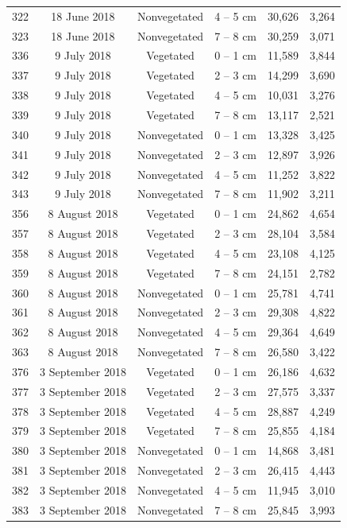 \documentclass[12pt,]{article}
\begin{document}
\begin{longtable}[t]{cccccc}
322 & 18 June 2018 & Nonvegetated & 4 – 5 cm & 30,626 & 3,264\\
323 & 18 June 2018 & Nonvegetated & 7 – 8 cm & 30,259 & 3,071\\
336 & 9 July 2018 & Vegetated & 0 – 1 cm & 11,589 & 3,844\\
337 & 9 July 2018 & Vegetated & 2 – 3 cm & 14,299 & 3,690\\
338 & 9 July 2018 & Vegetated & 4 – 5 cm & 10,031 & 3,276\\
339 & 9 July 2018 & Vegetated & 7 – 8 cm & 13,117 & 2,521\\
340 & 9 July 2018 & Nonvegetated & 0 – 1 cm & 13,328 & 3,425\\
341 & 9 July 2018 & Nonvegetated & 2 – 3 cm & 12,897 & 3,926\\
342 & 9 July 2018 & Nonvegetated & 4 – 5 cm & 11,252 & 3,822\\
343 & 9 July 2018 & Nonvegetated & 7 – 8 cm & 11,902 & 3,211\\
356 & 8 August 2018 & Vegetated & 0 – 1 cm & 24,862 & 4,654\\
357 & 8 August 2018 & Vegetated & 2 – 3 cm & 28,104 & 3,584\\
358 & 8 August 2018 & Vegetated & 4 – 5 cm & 23,108 & 4,125\\
359 & 8 August 2018 & Vegetated & 7 – 8 cm & 24,151 & 2,782\\
360 & 8 August 2018 & Nonvegetated & 0 – 1 cm & 25,781 & 4,741\\
361 & 8 August 2018 & Nonvegetated & 2 – 3 cm & 29,308 & 4,822\\
362 & 8 August 2018 & Nonvegetated & 4 – 5 cm & 29,364 & 4,649\\
363 & 8 August 2018 & Nonvegetated & 7 – 8 cm & 26,580 & 3,422\\
376 & 3 September 2018 & Vegetated & 0 – 1 cm & 26,186 & 4,632\\
377 & 3 September 2018 & Vegetated & 2 – 3 cm & 27,575 & 3,337\\
378 & 3 September 2018 & Vegetated & 4 – 5 cm & 28,887 & 4,249\\
379 & 3 September 2018 & Vegetated & 7 – 8 cm & 25,855 & 4,184\\
380 & 3 September 2018 & Nonvegetated & 0 – 1 cm & 14,868 & 3,481\\
381 & 3 September 2018 & Nonvegetated & 2 – 3 cm & 26,415 & 4,443\\
382 & 3 September 2018 & Nonvegetated & 4 – 5 cm & 11,945 & 3,010\\
383 & 3 September 2018 & Nonvegetated & 7 – 8 cm & 25,845 & 3,993\\

\end{longtable}
\end{document}
